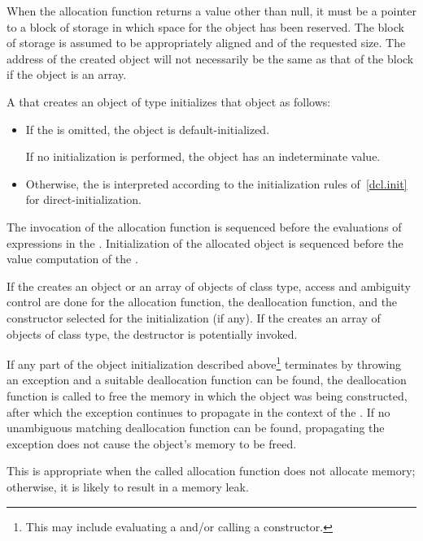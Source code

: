 \pnum
\begin{note}
When the allocation function returns a value other than null, it must be
a pointer to a block of storage in which space for the object has been
reserved. The block of storage is assumed to be appropriately aligned
and of the requested size. The address of the created object will not
necessarily be the same as that of the block if the object is an array.
\end{note}

\pnum
{}%
%
%
%
A  that creates an object of type 
initializes that object as follows:

\begin{itemize}
\item If the  is omitted, the object is
default-initialized.
\begin{note}
If no initialization
is performed, the object has an indeterminate value.
\end{note}

\item Otherwise, the  is interpreted according to
the initialization rules of~\ref{dcl.init} for direct-initialization.
\end{itemize}

\pnum
{}%
%
The invocation of the allocation function is sequenced before
the evaluations of expressions in the . Initialization of
the allocated object is sequenced before the
%
value computation of the
.

\pnum
If the  creates an object or an array of
objects of class type, access and ambiguity control are done for the
allocation function, the deallocation function, and
the constructor selected for the initialization (if any).
If the 
creates an array of objects of class type, the destructor is potentially
invoked.

\pnum
{}%
If any part of the object initialization described above\footnote{This may
include evaluating a  and/or calling
a constructor.}
terminates by throwing an exception and a suitable deallocation function
can be found, the deallocation function is called to free the memory in
which the object was being constructed, after which the exception
continues to propagate in the context of the .
If no unambiguous matching deallocation function can be found,
propagating the exception does not cause the object's memory to be
freed.
\begin{note}
This is appropriate when the called allocation function does not
allocate memory; otherwise, it is likely to result in a memory leak.
\end{note}

